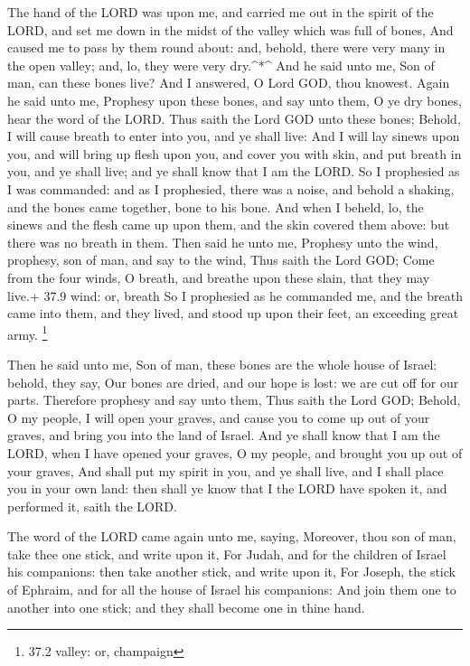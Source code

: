  The hand of the LORD was upon me, and carried me out in the
spirit of the LORD, and set me down in the midst of the valley which was
full of bones,  And caused me to pass by them round about:
and, behold, there were very many in the open valley; and, lo, they were
very dry.\^{}*\^{}  And he said unto me, Son of man, can
these bones live? And I answered, O Lord GOD, thou knowest. 
Again he said unto me, Prophesy upon these bones, and say unto them, O
ye dry bones, hear the word of the LORD.  Thus saith the
Lord GOD unto these bones; Behold, I will cause breath to enter into
you, and ye shall live:  And I will lay sinews upon you, and
will bring up flesh upon you, and cover you with skin, and put breath in
you, and ye shall live; and ye shall know that I am the LORD.
 So I prophesied as I was commanded: and as I prophesied,
there was a noise, and behold a shaking, and the bones came together,
bone to his bone.  And when I beheld, lo, the sinews and the
flesh came up upon them, and the skin covered them above: but there was
no breath in them.  Then said he unto me, Prophesy unto the
wind, prophesy, son of man, and say to the wind, Thus saith the Lord
GOD; Come from the four winds, O breath, and breathe upon these slain,
that they may live.+ 37.9 wind: or, breath  So I prophesied
as he commanded me, and the breath came into them, and they lived, and
stood up upon their feet, an exceeding great army. \footnote{37.2
  valley: or, champaign}

 Then he said unto me, Son of man, these bones are the
whole house of Israel: behold, they say, Our bones are dried, and our
hope is lost: we are cut off for our parts.  Therefore
prophesy and say unto them, Thus saith the Lord GOD; Behold, O my
people, I will open your graves, and cause you to come up out of your
graves, and bring you into the land of Israel.  And ye
shall know that I am the LORD, when I have opened your graves, O my
people, and brought you up out of your graves,  And shall
put my spirit in you, and ye shall live, and I shall place you in your
own land: then shall ye know that I the LORD have spoken it, and
performed it, saith the LORD.

 The word of the LORD came again unto me, saying,
 Moreover, thou son of man, take thee one stick, and write
upon it, For Judah, and for the children of Israel his companions: then
take another stick, and write upon it, For Joseph, the stick of Ephraim,
and for all the house of Israel his companions:  And join
them one to another into one stick; and they shall become one in thine
hand.

